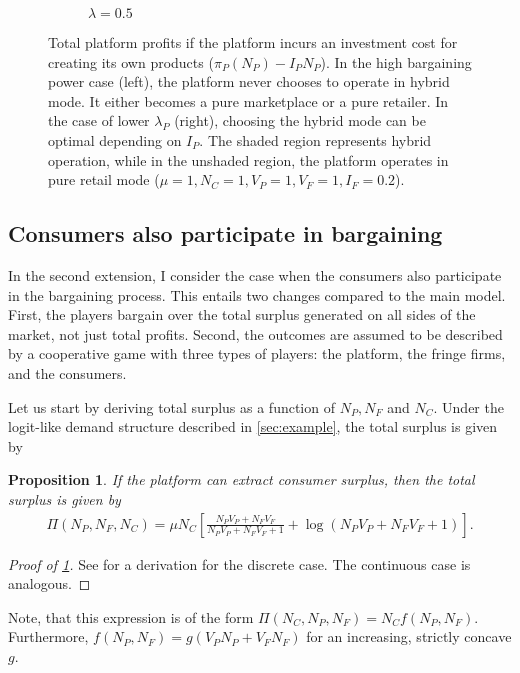 \documentclass[a4paper]{article}
\newtheorem{proposition}{Proposition}
\begin{document}
\begin{figure}
\begin{subfigure}[b]{0.45\textwidth}
        \caption{$\lambda = 0.5$}
    \end{subfigure}
    \caption{Total platform profits if the platform incurs an investment cost for creating its own products ($\pi_P(N_P) - I_P N_P$). In the high bargaining power case (left), the platform never chooses to operate in hybrid mode. It either becomes a pure marketplace or a pure retailer. In the case of lower $\lambda_P$ (right), choosing the hybrid mode can be optimal depending on $I_P$. The shaded region represents hybrid operation, while in the unshaded region, the platform operates in pure retail mode ($\mu = 1, N_C = 1, V_P = 1, V_F = 1, I_F = 0.2$).}
    \label{fig:equilibrium_low_lambda_entry_fees}
\end{figure}


\subsection{Consumers also participate in bargaining}
\label{sec:two_sided}

In the second extension, I consider the case when the consumers also participate in the bargaining process.
This entails two changes compared to the main model.
First, the players bargain over the total surplus generated on all sides of the market, not just total profits.
Second, the outcomes are assumed to be described by a cooperative game with three types of players: the platform, the fringe firms, and the consumers.

Let us start by deriving total surplus as a function of $N_P, N_F$ and $N_C$.
Under the logit-like demand structure described in \cref{sec:example}, the total surplus is given by
\begin{proposition}
    \label{prop:profits_total_surplus}
    If the platform can extract consumer surplus, then the total surplus is given by
    \begin{align*}
        \Pi(N_P, N_F, N_C) = \mu N_C \left[ \frac{N_P V_P + N_F V_F}{N_P V_P + N_F V_F + 1} + \log(N_P V_P + N_F V_F + 1) \right].
    \end{align*}
\end{proposition}
\begin{proof}[Proof of \cref{prop:profits_total_surplus}]
    See \textcite{small1981applied} for a derivation for the discrete case.
    The continuous case is analogous.
\end{proof}
Note, that this expression is of the form $\Pi(N_C, N_P, N_F) = N_C f(N_P, N_F)$.
Furthermore, $f(N_P, N_F) = g(V_P N_P + V_F N_F)$ for an increasing, strictly concave $g$.
\end{document}
